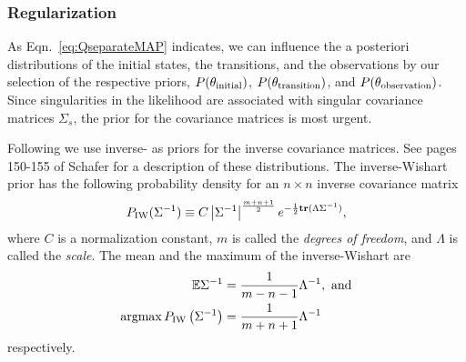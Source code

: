 \subsubsection{Regularization}

As Eqn.~\eqref{eq:QseparateMAP} indicates, we can influence the a
posteriori distributions of the initial states, the transitions, and
the observations by our selection of the respective priors,
$P(\theta_{\text{initial}})$, $P(\theta_{\text{transition}})$, and
$P(\theta_{\text{observation}})$.  Since singularities in the likelihood
are associated with singular covariance matrices $\Sigma_s$, the prior
for the covariance matrices is most urgent.

Following \cite{Gauvain94, Ormoneit95} we use inverse- as priors for the inverse covariance matrices.  See
pages 150-155 of Schafer \cite{Schafer97} for a description of these
distributions.  The inverse-Wishart prior has the following
probability density for an $n\times n$ inverse covariance matrix
\begin{equation*}
  P_{\text{IW}}(\Sigma^{-1}) \equiv C \left| \Sigma^{-1}
                    \right|^{\frac{m+n+1}{2}}
                    e^{-\frac{1}{2} {\bf tr}(\Lambda \Sigma^{-1})},
\end{equation*}
where $C$ is a normalization constant, $m$ is called the \emph{degrees
  of freedom}, and $\Lambda$ is called the \emph{scale}.  The mean and
the maximum of the inverse-Wishart are
\begin{align*}
  \mathbb{E} \Sigma^{-1} &= \frac{1}{m-n-1} \Lambda^{-1}, \text{ and} \\
  \operatorname*{argmax} P_{\text{IW}} \left( \Sigma^{-1} \right) &= \frac{1}{m+n+1}
  \Lambda^{-1}
\end{align*}
respectively.

